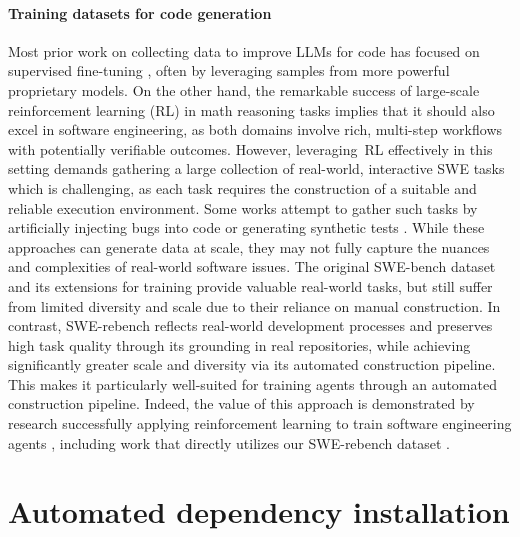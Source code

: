 \documentclass[dandb]{article}
\begin{document}
\paragraph{Training datasets for code generation} Most prior work on collecting data to improve LLMs for code has focused on supervised fine-tuning \citep{muennighoff2024octopackinstructiontuningcode, luo2023wizardcoderempoweringcodelarge, liu2024learningcodepreferencesynthetic}, often by leveraging samples from more powerful proprietary models. On the other hand, the remarkable success of large-scale reinforcement learning (RL) in math reasoning tasks \citep{deepseekai2025deepseekr1incentivizingreasoningcapability, seed2025seed15thinkingadvancingsuperbreasoning, openthoughts} implies that it should also excel in software engineering, as both domains involve rich, multi-step workflows with potentially verifiable outcomes. However, leveraging~RL effectively in this setting demands gathering a large collection of real-world, interactive SWE tasks which is challenging, as each task requires the construction of a suitable and reliable execution environment. Some works attempt to gather such tasks by artificially injecting bugs into code \citep{yang2025swesmithscalingdatasoftware} or generating synthetic tests \citep{xie2025repostscalablerepositorylevelcoding}. While these approaches can generate data at scale, they may not fully capture the nuances and complexities of real-world software issues. The original SWE-bench dataset and its extensions for training \citep{pan2024trainingsoftwareengineeringagents} provide valuable real-world tasks, but still suffer from limited diversity and scale due to their reliance on manual construction. In contrast, SWE-rebench reflects real-world development processes and preserves high task quality through its grounding in real repositories, while achieving significantly greater scale and diversity via its automated construction pipeline. This makes it particularly well-suited for training agents through an automated construction pipeline. Indeed, the value of this approach is demonstrated by research successfully applying reinforcement learning to train software engineering agents \citep{deepswe2025, cao2025skyrl}, including work that directly utilizes our SWE-rebench dataset \citep{yang2025kimidevagentlesstrainingskill}.

\section{Automated dependency installation}
\end{document}
